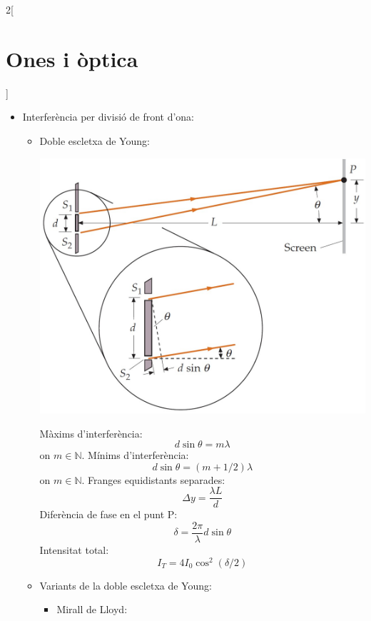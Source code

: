 \documentclass[class=article,10pt,crop=false]{standalone}
\begin{document}
\begin{multicols}{2}[\section{Ones i òptica}]
\begin{itemize}
\begin{itemize}
\begin{itemize}
\begin{minipage}{\linewidth}
            \end{minipage}
        \end{itemize}
    \end{itemize}
    \item Interferència per divisió de front d'ona:
    \begin{itemize}
        \item Doble escletxa de Young:\newline
        \begin{minipage}{\linewidth}
            \includegraphics[width=\linewidth]{Physics/1st/Waves_and_optics/Images/young.jpg} 
        \end{minipage}
Màxims d'interferència: $$d\sin\theta=m\lambda$${\footnotesize on $m\in\mathbb{N}$.}\newline 
Mínims d'interferència: $$d\sin\theta=(m+1/2)\lambda$$ {\footnotesize on $m\in\mathbb{N}$.}\newline 
Franges equidistants separades: $$\Delta y=\frac{\lambda L}{d}$$
Diferència de fase en el punt P:
        $$\delta=\frac{2\pi}{\lambda}d\sin\theta$$
        Intensitat total: $$I_T=4I_0\cos^2(\delta/2)$$
        \item Variants de la doble escletxa de Young:
    \begin{itemize}
        \item Mirall de Lloyd:\newline
        \begin{minipage}{\linewidth}

\end{minipage}
\end{itemize}
\end{itemize}
\end{itemize}
\end{multicols}
\end{document}
